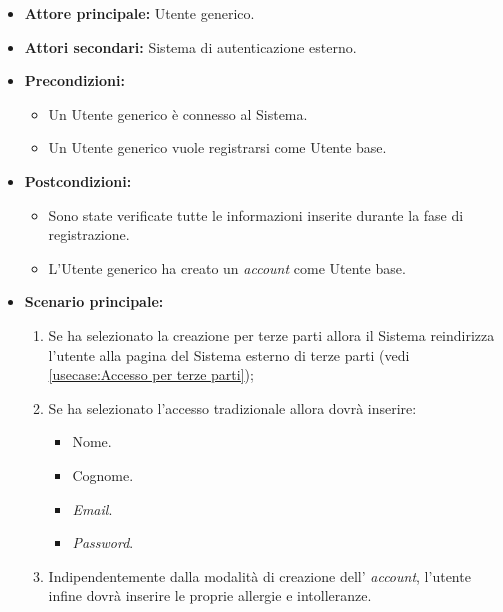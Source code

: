 \label{usecase:Registrazione Utente base}
\begin{itemize}

	\item \textbf{Attore principale:} Utente generico.
	\item \textbf{Attori secondari:} Sistema di autenticazione esterno.

	\item \textbf{Precondizioni:} 
	\begin{itemize}
        \item  Un Utente generico è connesso al Sistema.
        \item  Un Utente generico vuole registrarsi come Utente base.
    \end{itemize}
    

	\item \textbf{Postcondizioni:} 
    \begin{itemize}
        \item  Sono state verificate tutte le informazioni inserite durante la fase di registrazione.
        \item  L'Utente generico ha creato un \textit{account} come Utente base.
    \end{itemize}

	\item \textbf{Scenario principale:}
	\begin{enumerate}

            \item Se ha selezionato la creazione per terze parti allora il Sistema reindirizza l'utente alla pagina del Sistema esterno di terze parti (vedi \autoref{usecase:Accesso per terze parti});
            \item Se ha selezionato l'accesso tradizionale allora dovrà inserire:
            \begin{itemize}
                \item Nome.
                \item Cognome.
                \item \textit{Email}.
                \item \textit{Password}.
            \end{itemize}
            \item Indipendentemente dalla modalità di creazione dell' \textit{account}, l'utente infine dovrà inserire le proprie allergie e intolleranze.
            
	\end{enumerate}
	
\end{itemize}

